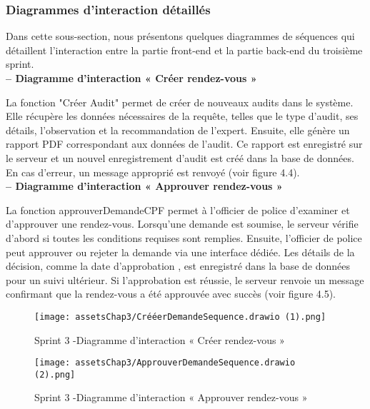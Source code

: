 \subsubsection{Diagrammes d'interaction détaillés}
Dans cette sous-section, nous présentons quelques diagrammes de séquences qui détaillent
l'interaction entre la partie front-end et la partie back-end du troisième sprint.
\\

\textbf{– Diagramme d'interaction « Créer rendez-vous »}

La fonction "Créer Audit" permet de créer de nouveaux audits dans le système. Elle récupère les données nécessaires de la requête, telles que le type d'audit, ses détails, l'observation et la recommandation de l'expert. Ensuite, elle génère un rapport PDF correspondant aux données de l'audit. Ce rapport est enregistré sur le serveur et un nouvel enregistrement d'audit est créé dans la base de données. \\
En cas d'erreur, un message approprié est renvoyé (voir figure 4.4).\\

\textbf{– Diagramme d'interaction « Approuver rendez-vous »}

La fonction approuverDemandeCPF permet à l'officier de police d'examiner et d'approuver une rendez-vous. Lorsqu'une demande est soumise, le serveur vérifie d'abord si toutes les conditions requises sont remplies. Ensuite, l'officier de police peut approuver ou rejeter la demande via une interface dédiée. Les détails de la décision, comme la date d'approbation , est enregistré dans la base de données pour un suivi ultérieur. Si l'approbation est réussie, le serveur renvoie un message confirmant que la rendez-vous a été approuvée avec succès (voir figure 4.5). \\



\begin{figure}[H]
\centering
\texttt{[image: assetsChap3/CrééerDemandeSequence.drawio (1).png]}
\caption{ Sprint 3 -Diagramme d'interaction « Créer rendez-vous » }
\end{figure}



\begin{figure}[H]
\centering
\texttt{[image: assetsChap3/ApprouverDemandeSequence.drawio (2).png]}
\caption{ Sprint 3 -Diagramme d'interaction « Approuver rendez-vous » }
\end{figure}




